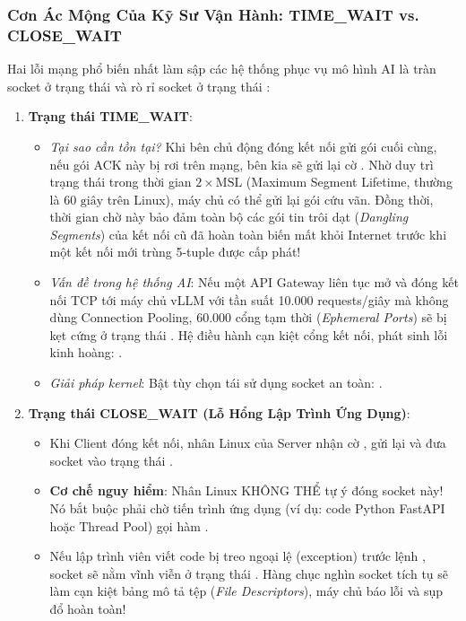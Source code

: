 \subsubsection{Cơn Ác Mộng Của Kỹ Sư Vận Hành: TIME\_WAIT vs. CLOSE\_WAIT}
Hai lỗi mạng phổ biến nhất làm sập các hệ thống phục vụ mô hình AI là tràn socket ở trạng thái  và rò rỉ socket ở trạng thái :
\begin{enumerate}
  \item \textbf{Trạng thái TIME\_WAIT}:
    \begin{itemize}
      \item \textit{Tại sao cần tồn tại?} Khi bên chủ động đóng kết nối gửi gói  cuối cùng, nếu gói ACK này bị rơi trên mạng, bên kia sẽ gửi lại cờ . Nhờ duy trì trạng thái  trong thời gian $2 \times \text{MSL}$ (Maximum Segment Lifetime, thường là $60\text{ giây}$ trên Linux), máy chủ có thể gửi lại gói  cứu vãn. Đồng thời, thời gian chờ này bảo đảm toàn bộ các gói tin trôi dạt (\textit{Dangling Segments}) của kết nối cũ đã hoàn toàn biến mất khỏi Internet trước khi một kết nối mới trùng 5-tuple được cấp phát!
      \item \textit{Vấn đề trong hệ thống AI}: Nếu một API Gateway liên tục mở và đóng kết nối TCP tới máy chủ vLLM với tần suất 10.000 requests/giây mà không dùng Connection Pooling, 60.000 cổng tạm thời (\textit{Ephemeral Ports}) sẽ bị kẹt cứng ở trạng thái . Hệ điều hành cạn kiệt cổng kết nối, phát sinh lỗi kinh hoàng: .
      \item \textit{Giải pháp kernel}: Bật tùy chọn tái sử dụng socket an toàn: .
    \end{itemize}
  \item \textbf{Trạng thái CLOSE\_WAIT (Lỗ Hổng Lập Trình Ứng Dụng)}:
    \begin{itemize}
      \item Khi Client đóng kết nối, nhân Linux của Server nhận cờ , gửi lại  và đưa socket vào trạng thái .
      \item \textbf{Cơ chế nguy hiểm}: Nhân Linux KHÔNG THỂ tự ý đóng socket này! Nó bắt buộc phải chờ tiến trình ứng dụng (ví dụ: code Python FastAPI hoặc Thread Pool) gọi hàm .
      \item Nếu lập trình viên viết code bị treo ngoại lệ (exception) trước lệnh , socket sẽ nằm vĩnh viễn ở trạng thái . Hàng chục nghìn socket tích tụ sẽ làm cạn kiệt bảng mô tả tệp (\textit{File Descriptors}), máy chủ báo lỗi  và sụp đổ hoàn toàn!
    \end{itemize}
\end{enumerate}

